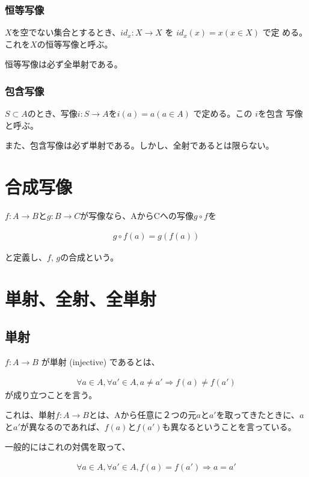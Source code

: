 \documentclass[dvipdfmx,autodetect-engine]{jsarticle}
\begin{document}
\subsubsection{恒等写像}

$X$を空でない集合とするとき、$id_x : X → X$ を $id_x(x) = x (x ∈ X)$ で定
める。これを$X$の恒等写像と呼ぶ。

恒等写像は必ず全単射である。

\subsubsection{包含写像}

$S \subset A$のとき、写像$i: S \to A$を$i(a) = a (a \in A)$ で定める。この $i$を包含
写像と呼ぶ。

また、包含写像は必ず単射である。しかし、全射であるとは限らない。

\section{合成写像}

$f: A \to B$と$g: B \to C$が写像なら、AからCへの写像$g \circ f$を

\begin{eqnarray*}
g \circ f(a) = g(f(a))
\end{eqnarray*}

と定義し、$f$, $g$の合成という。

\section{単射、全射、全単射}

\subsection{単射}

$f: A \to B$ が単射 (injective) であるとは、

\begin{eqnarray*}
\forall a \in A, \forall a' \in A, a \neq a' \Rightarrow f(a) \neq f(a')
\end{eqnarray*}
が成り立つことを言う。

これは、単射$f: A \to B$とは、Aから任意に２つの元$a$と$a'$を取ってきたときに、$a
$と$a'$が異なるのであれば、$f(a)$と$f(a')$も異なるということを言っている。

一般的にはこれの対偶を取って、

\begin{eqnarray*}
\forall a \in A, \forall a' \in A, f(a) = f(a') \Rightarrow a = a'
\end{eqnarray*}
\end{document}
